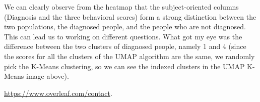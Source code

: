 \documentclass{article}
\begin{document}
\begin{figure}[H]
    \centering
\end{figure}

We can clearly observe from the heatmap that the subject-oriented columns (Diagnosis and the three behavioral scores) form a strong distinction between the two populations, the diagnosed people, and the people who are not diagnosed. This can lead us to working on different questions. What got my eye was the difference between the two clusters of diagnosed people, namely 1 and 4 (since the scores for all the clusters of the UMAP algorithm are the same, we randomly pick the K-Means clustering, so we can see the indexed clusters in the UMAP K-Means image above).

\url{https://www.overleaf.com/contact}.



\end{document}
